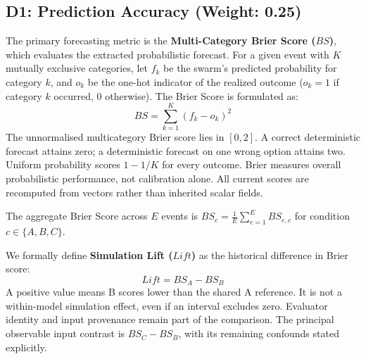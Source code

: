 \subsection{D1: Prediction Accuracy (Weight: 0.25)}
The primary forecasting metric is the \textbf{Multi-Category Brier Score ($BS$)}, which evaluates the extracted probabilistic forecast. For a given event with $K$ mutually exclusive categories, let $f_k$ be the swarm's predicted probability for category $k$, and $o_k$ be the one-hot indicator of the realized outcome ($o_k = 1$ if category $k$ occurred, $0$ otherwise). The Brier Score is formulated as:
\begin{equation}
    BS = \sum_{k=1}^K (f_k - o_k)^2
\end{equation}
The unnormalised multicategory Brier score lies in $[0,2]$. A correct deterministic forecast attains zero; a deterministic forecast on one wrong option attains two. Uniform probability scores $1-1/K$ for every outcome. Brier measures overall probabilistic performance, not calibration alone. All current scores are recomputed from vectors rather than inherited scalar fields.

The aggregate Brier Score across $E$ events is $BS_c = \frac{1}{E} \sum_{e=1}^E BS_{e,c}$ for condition $c \in \{A, B, C\}$. 

We formally define \textbf{Simulation Lift ($Lift$)} as the historical difference in Brier score:
\begin{equation}
    Lift = BS_A - BS_B
\end{equation}
A positive value means B scores lower than the shared A reference. It is not a within-model simulation effect, even if an interval excludes zero. Evaluator identity and input provenance remain part of the comparison. The principal observable input contrast is $BS_C-BS_B$, with its remaining confounds stated explicitly.

